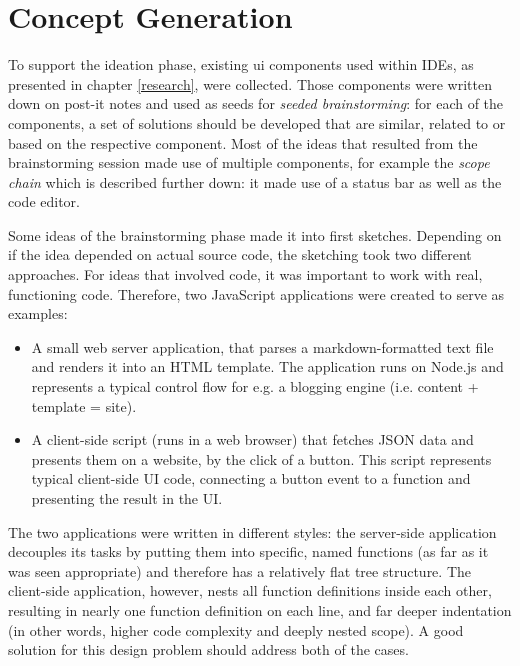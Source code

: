 \section{Concept Generation}\label{concept-generation}

To support the ideation phase, existing \ac{ui} components used within
IDEs, as presented in chapter \ref{research}, were collected. Those
components were written down on post-it notes and used as seeds for
\emph{seeded brainstorming}: for each of the components, a set of
solutions should be developed that are similar, related to or based on
the respective component. Most of the ideas that resulted from the
brainstorming session made use of multiple components, for example the
\emph{scope chain} which is described further down: it made use of a
status bar as well as the code editor.

Some ideas of the brainstorming phase made it into first sketches.
Depending on if the idea depended on actual source code, the sketching
took two different approaches. For ideas that involved code, it was
important to work with real, functioning code. Therefore, two JavaScript
applications were created to serve as examples:

\begin{itemize}
\itemsep1pt\parskip0pt
\item
  A small web server application, that parses a markdown-formatted text
  file and renders it into an HTML template. The application runs on
  Node.js and represents a typical control flow for e.g. a blogging
  engine (i.e. content + template = site).
\item
  A client-side script (runs in a web browser) that fetches JSON data
  and presents them on a website, by the click of a button. This script
  represents typical client-side UI code, connecting a button event to a
  function and presenting the result in the UI.
\end{itemize}

The two applications were written in different styles: the server-side
application decouples its tasks by putting them into specific, named
functions (as far as it was seen appropriate) and therefore has a
relatively flat tree structure. The client-side application, however,
nests all function definitions inside each other, resulting in nearly
one function definition on each line, and far deeper indentation (in
other words, higher code complexity and deeply nested scope). A good
solution for this design problem should address both of the cases.

